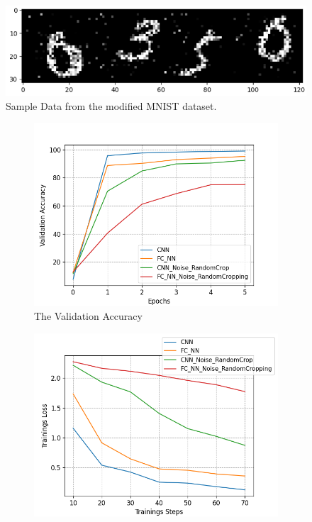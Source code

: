 \begin{figure}%
    \includegraphics[width=1\linewidth]{figures/sample_modified_dataset.png}
    \caption{Sample Data from the modified MNIST dataset.}
    \label{fig:modified-dataset}
\end{figure}

\begin{figure}[h]
    \begin{subfigure}[b]{0.5\textwidth}
        \includegraphics[width=\textwidth]{figures/val_acc_result_data.png}
        \caption{The Validation Accuracy}
    \end{subfigure}
     \begin{subfigure}[b]{0.5\textwidth}
        \includegraphics[width=\textwidth]{figures/train_loss_accumulated_result_data.png}

\end{subfigure}
\end{figure}
